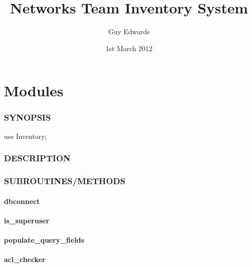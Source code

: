\documentclass{book}
\author{Guy Edwards}
\title{Networks Team Inventory System}
\date{1st March 2012}
\begin{document}
\maketitle
\tableofcontents


\part{Modules}




\section{SYNOPSIS}
\label{_SYNOPSIS}
\hypertarget{_SYNOPSIS}{}



use Inventory;


\section{DESCRIPTION}
\label{_DESCRIPTION}
\hypertarget{_DESCRIPTION}{}


\section{SUBROUTINES/METHODS}
\label{_SUBROUTINES_METHODS}
\hypertarget{_SUBROUTINES_METHODS}{}


\subsection{dbconnect}
\label{_dbconnect}
\hypertarget{_dbconnect}{}


\subsection{is\protect\_superuser}
\label{_is_superuser}
\hypertarget{_is_superuser}{}


\subsection{populate\protect\_query\protect\_fields}
\label{_populate_query_fields}
\hypertarget{_populate_query_fields}{}


\subsection{acl\protect\_checker}
\label{_acl_checker}
\hypertarget{_acl_checker}{}
\end{document}
